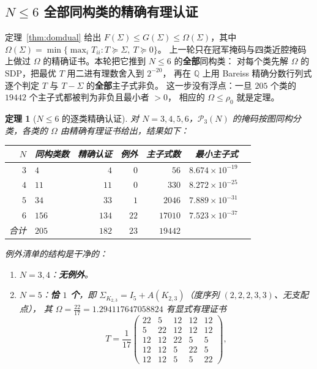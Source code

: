\documentclass[UTF8,11pt]{ctexart}
\newtheorem{theorem}{定理}[section]
\theoremstyle{definition}
\newcommand{\Q}{\mathbb{Q}}
\begin{document}
\subsection{$N\le6$ 全部同构类的精确有理认证}\label{sec:ncert6}

定理~\ref{thm:domdual} 给出 $F(\Sigma)\le G(\Sigma)\le\Omega(\Sigma)$，其中
$\Omega(\Sigma)=\min\{\max_iT_{ii}:T\succeq\Sigma,\ T\succeq0\}$。
上一轮只在冠军掩码与四类近腔掩码上做过 $\Omega$ 的精确证书。本轮把它推到 $N\le6$ 的\textbf{全部}同构类：
对每个类先解 $\Omega$ 的 SDP，把最优 $T$ 用二进有理数舍入到 $2^{-20}$，
再在 $\Q$ 上用 Bareiss 精确分数行列式逐个判定 $T$ 与 $T-\Sigma$ 的\textbf{全部}主子式非负。
这一步没有浮点：一旦 $205$ 个类的 $19442$ 个主子式都被判为非负且最小者 $>0$，
相应的 $\Omega\le\rho_0$ 就是定理。

\begin{theorem}[$N\le6$ 的逐类精确认证]\label{thm:ncert6}
对 $N=3,4,5,6$，$\mathcal P_3(N)$ 的掩码按图同构分类，各类的 $\Omega$ 由精确有理证书给出，结果如下：
\begin{center}
\begin{tabular}{r@{\quad}l r r r r r}
\toprule
$N$ & 同构类数 & 精确认证 & 例外 & 主子式数 & 最小主子式\\
\midrule
$3$ & $4$   & $4$   & $0$  & $56$    & $8.674\times10^{-19}$\\
$4$ & $11$  & $11$  & $0$  & $330$   & $8.272\times10^{-25}$\\
$5$ & $34$  & $33$  & $1$  & $2046$  & $7.889\times10^{-31}$\\
$6$ & $156$ & $134$ & $22$ & $17010$ & $7.523\times10^{-37}$\\
\midrule
合计 & $205$ & $182$ & $23$ & $19442$ & \\
\bottomrule
\end{tabular}
\end{center}
例外清单的结构是干净的：
\begin{enumerate}[label=(\roman*),leftmargin=2em]
\item $N=3,4$：\textbf{无例外}。
\item $N=5$：\textbf{恰 $1$ 个}，即 $\Sigma_{K_{2,3}}=I_5+A(K_{2,3})$（度序列 $(2,2,2,3,3)$、无支配点），
其 $\Omega=\frac{22}{17}=1.294117647058824$ 有显式有理证书
\[
T=\frac1{17}\begin{pmatrix}22&5&12&12&12\\5&22&12&12&12\\12&12&22&5&5\\12&12&5&22&5\\12&12&5&5&22\end{pmatrix},
\]
\end{enumerate}
\end{theorem}
\end{document}
